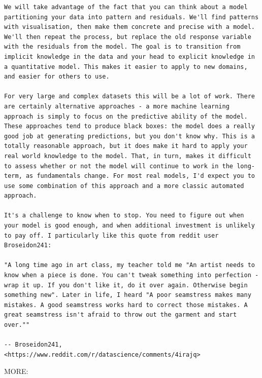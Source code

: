 \documentclass[
]{book}
\begin{document}
\begin{verbatim}
We will take advantage of the fact that you can think about a model partitioning your data into pattern and residuals. We'll find patterns with visualisation, then make them concrete and precise with a model. We'll then repeat the process, but replace the old response variable with the residuals from the model. The goal is to transition from implicit knowledge in the data and your head to explicit knowledge in a quantitative model. This makes it easier to apply to new domains, and easier for others to use.

For very large and complex datasets this will be a lot of work. There are certainly alternative approaches - a more machine learning approach is simply to focus on the predictive ability of the model. These approaches tend to produce black boxes: the model does a really good job at generating predictions, but you don't know why. This is a totally reasonable approach, but it does make it hard to apply your real world knowledge to the model. That, in turn, makes it difficult to assess whether or not the model will continue to work in the long-term, as fundamentals change. For most real models, I'd expect you to use some combination of this approach and a more classic automated approach.

It's a challenge to know when to stop. You need to figure out when your model is good enough, and when additional investment is unlikely to pay off. I particularly like this quote from reddit user Broseidon241:

"A long time ago in art class, my teacher told me "An artist needs to know when a piece is done. You can't tweak something into perfection - wrap it up. If you don't like it, do it over again. Otherwise begin something new". Later in life, I heard "A poor seamstress makes many mistakes. A good seamstress works hard to correct those mistakes. A great seamstress isn't afraid to throw out the garment and start over.""

-- Broseidon241, <https://www.reddit.com/r/datascience/comments/4irajq>
\end{verbatim}

MORE:
\end{document}
